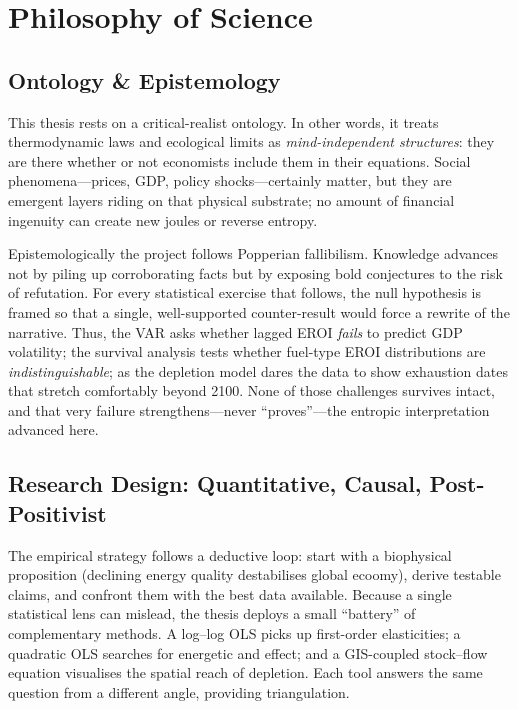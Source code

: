 \documentclass[a4paper,12pt]{article}
\begin{document}
\section{Philosophy of Science}
\subsection{Ontology \& Epistemology}
\label{sec:ontology_epistemology}
This thesis rests on a critical-realist ontology.  
In other words, it treats thermodynamic laws and ecological limits as
\emph{mind-independent structures}: they are there whether or not economists include them in
their equations.  Social phenomena—prices, GDP, policy shocks—certainly matter, but they are
emergent layers riding on that physical substrate; no amount of financial ingenuity can create
new joules or reverse entropy.

Epistemologically the project follows Popperian fallibilism.  
Knowledge advances not by piling up corroborating facts but by exposing bold conjectures to
the risk of refutation.  For every statistical exercise that follows, the
null hypothesis is framed so that a single, well-supported counter-result would force a rewrite
of the narrative.  Thus, the VAR asks whether lagged EROI \emph{fails} to predict GDP
volatility; the survival analysis tests whether fuel-type EROI distributions are
\emph{indistinguishable}; as the depletion model dares the data to show exhaustion dates that
stretch comfortably beyond 2100.  None of those challenges survives intact, and that very
failure strengthens—never “proves”—the entropic interpretation advanced here.

\subsection{Research Design: Quantitative, Causal, Post-Positivist}
\label{sec:research_design}
The empirical strategy follows a deductive loop: start with a
biophysical proposition (declining energy quality destabilises global ecoomy), derive testable
claims, and confront them with the best data available.  Because a single statistical lens can
mislead, the thesis deploys a small “battery” of complementary methods.  
A log–log OLS picks up first-order elasticities; a quadratic OLS searches for energetic
and effect; and a GIS-coupled stock–flow equation visualises the spatial reach of depletion.
Each tool answers the same question from a different angle, providing triangulation.
\end{document}
